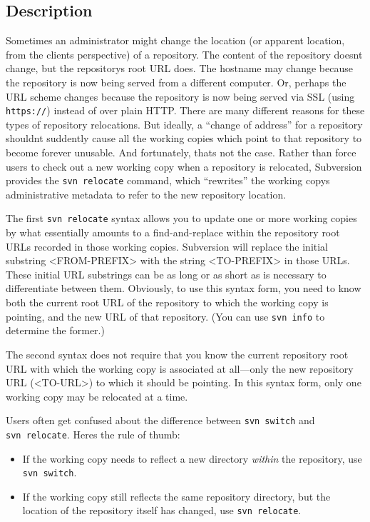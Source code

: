 \subsection{Description}

Sometimes an administrator might change the location (or apparent
location, from the client\textquotesingle s perspective) of a
repository. The content of the repository doesn\textquotesingle t
change, but the repository\textquotesingle s root URL does. The hostname
may change because the repository is now being served from a different
computer. Or, perhaps the URL scheme changes because the repository is
now being served via SSL (using \texttt{https://}) instead of over plain
HTTP. There are many different reasons for these types of repository
relocations. But ideally, a ``change of address'' for a repository
shouldn\textquotesingle t suddently cause all the working copies which
point to that repository to become forever unusable. And fortunately,
that\textquotesingle s not the case. Rather than force users to check
out a new working copy when a repository is relocated, Subversion
provides the \texttt{svn\ relocate} command, which ``rewrites'' the
working copy\textquotesingle s administrative metadata to refer to the
new repository location.

The first \texttt{svn\ relocate} syntax allows you to update one or more
working copies by what essentially amounts to a find-and-replace within
the repository root URLs recorded in those working copies. Subversion
will replace the initial substring \textless FROM-PREFIX\textgreater{}
with the string \textless TO-PREFIX\textgreater{} in those URLs. These
initial URL substrings can be as long or as short as is necessary to
differentiate between them. Obviously, to use this syntax form, you need
to know both the current root URL of the repository to which the working
copy is pointing, and the new URL of that repository. (You can use
\texttt{svn\ info} to determine the former.)

The second syntax does not require that you know the current repository
root URL with which the working copy is associated at all---only the new
repository URL (\textless TO-URL\textgreater) to which it should be
pointing. In this syntax form, only one working copy may be relocated at
a time.

Users often get confused about the difference between
\texttt{svn\ switch} and \texttt{svn\ relocate}. Here\textquotesingle s
the rule of thumb:

\begin{itemize}
\item
  If the working copy needs to reflect a new directory \emph{within} the
  repository, use \texttt{svn\ switch}.
\item
  If the working copy still reflects the same repository directory, but
  the location of the repository itself has changed, use
  \texttt{svn\ relocate}.
\end{itemize}

